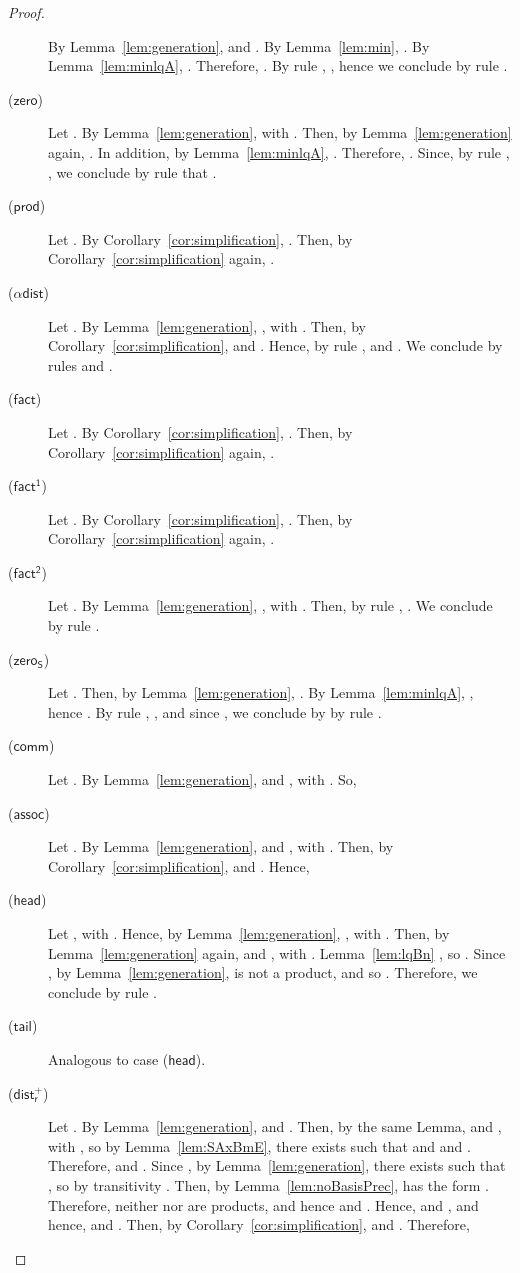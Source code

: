 \documentclass[preprint]{elsarticle}
\newcommand\s[1]{\ensuremath{\mathsf{#1}}}
\newcommand\rzero{(\s{zero})}
\newcommand\rzeroS{(\s{zero_S})}
\newcommand\rprod{(\s{prod})}
\newcommand\rdists{(\s{\alpha dist})}
\newcommand\rfact{(\s{fact})}
\newcommand\rfacto{(\s{fact^1})}
\newcommand\rfactt{(\s{fact^2})}
\newcommand\rhead{(\s{head})}
\newcommand\rtail{(\s{tail})}
\newcommand\rdistsumr{(\s{dist^+_r})}
\newcommand\rcomm{(\s{comm})}
\newcommand\rassoc{(\s{assoc})}
\begin{document}
\begin{proof}
\begin{description}
    By Lemma~\ref{lem:generation},  and .
    By Lemma~\ref{lem:min}, . By
    Lemma~\ref{lem:minlqA}, . Therefore,
    .
    By rule , ,
    hence we conclude by rule .
  \item[\rzero] Let .
    By Lemma~\ref{lem:generation},  with .
    Then, by Lemma~\ref{lem:generation} again, .
    In addition, by Lemma~\ref{lem:minlqA}, .
    Therefore, .
    Since, by rule , , we
    conclude by rule  that .
  \item[\rprod] Let . By
    Corollary~\ref{cor:simplification}, . Then, by
    Corollary~\ref{cor:simplification} again, .
  \item[\rdists] Let . By Lemma~\ref{lem:generation},
    , with . Then, by
    Corollary~\ref{cor:simplification},  and . Hence, by
    rule ,  and . We
    conclude by rules  and .
  \item[\rfact] Let . By
    Corollary~\ref{cor:simplification}, . Then, by
    Corollary~\ref{cor:simplification} again, .
  \item[\rfacto] Let . By
    Corollary~\ref{cor:simplification}, . Then, by
    Corollary~\ref{cor:simplification} again, .
  \item[\rfactt] Let . By Lemma~\ref{lem:generation},
    , with . Then, by rule , . We conclude by rule .
  \item[\rzeroS] Let . Then, by Lemma~\ref{lem:generation},
    .
    By Lemma~\ref{lem:minlqA}, , hence
    .
    By rule , , and
    since , we conclude by by rule
    .
  \item[\rcomm] Let . By Lemma~\ref{lem:generation},  and , with . So,
    
  \item[\rassoc] Let . By Lemma~\ref{lem:generation},
     and , with . Then, by
    Corollary~\ref{cor:simplification},  and . Hence,
    
  \item[\rhead] Let , with . Hence, by
    Lemma~\ref{lem:generation}, , with . Then, by Lemma~\ref{lem:generation} again,  and , with .
    Lemma~\ref{lem:lqBn}   
    , so .
    Since , by Lemma~\ref{lem:generation},  is not a product,
    and so . Therefore, we conclude by rule .
  \item[\rtail] Analogous to case \rhead.
  \item[\rdistsumr] Let . By Lemma~\ref{lem:generation},  and
    . Then, by the same Lemma,
     and , with , so by Lemma~\ref{lem:SAxBmE}, there exists  such that
     and  and .
    Therefore,  and .
    Since , by Lemma~\ref{lem:generation}, there exists 
    such that , so by transitivity . Then, by
    Lemma~\ref{lem:noBasisPrec},  has the form .
    Therefore, neither  nor  are products, and hence  and
    .
    Hence,  and , and hence, 
    and . Then, by Corollary~\ref{cor:simplification},  and . Therefore,
    

\end{description}
\end{proof}
\end{document}
